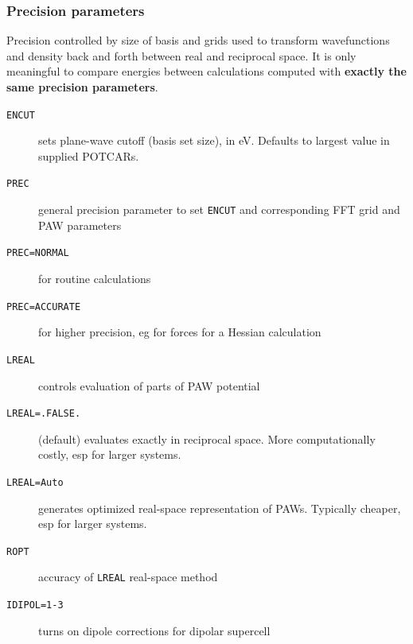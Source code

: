 \documentclass[11pt]{article}
\begin{document}
\subsubsection{Precision parameters}
\label{sec:org4ca6a6f}
Precision controlled by size of basis and grids used to transform wavefunctions and density back and forth between real and reciprocal space. It is only meaningful to compare energies between calculations computed with \textbf{exactly the same precision parameters}.
\begin{description}
\item[{\texttt{ENCUT}}] sets plane-wave cutoff (basis set size), in eV.  Defaults to largest value in supplied POTCARs.
\item[{\texttt{PREC}}] general precision parameter to set \texttt{ENCUT} and corresponding FFT grid and PAW parameters
\item[{\texttt{PREC=NORMAL}}] for routine calculations
\item[{\texttt{PREC=ACCURATE}}] for higher precision, eg for forces for a Hessian calculation
\item[{\texttt{LREAL}}] controls evaluation of parts of PAW potential
\item[{\texttt{LREAL=.FALSE.}}] (default) evaluates exactly in reciprocal space. More computationally costly, esp for larger systems.
\item[{\texttt{LREAL=Auto}}] generates optimized real-space representation of PAWs.  Typically cheaper, esp for larger systems.
\item[{\texttt{ROPT}}] accuracy of \texttt{LREAL} real-space method
\item[{\texttt{IDIPOL=1-3}}] turns on dipole corrections for dipolar supercell
\end{description}
\end{document}
